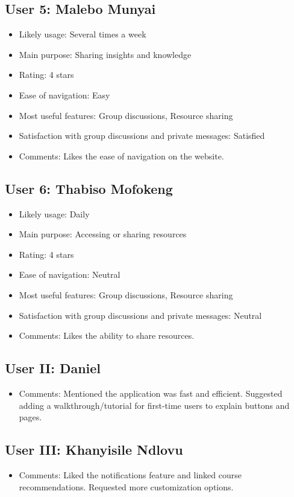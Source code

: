 \subsection*{User 5: Malebo Munyai}
\begin{itemize}
    \item Likely usage: Several times a week
    \item Main purpose: Sharing insights and knowledge
    \item Rating: 4 stars
    \item Ease of navigation: Easy
    \item Most useful features: Group discussions, Resource sharing
    \item Satisfaction with group discussions and private messages: Satisfied
    \item Comments: Likes the ease of navigation on the website.
\end{itemize}

\subsection*{User 6: Thabiso Mofokeng}
\begin{itemize}
    \item Likely usage: Daily
    \item Main purpose: Accessing or sharing resources
    \item Rating: 4 stars
    \item Ease of navigation: Neutral
    \item Most useful features: Group discussions, Resource sharing
    \item Satisfaction with group discussions and private messages: Neutral
    \item Comments: Likes the ability to share resources.
\end{itemize}

\subsection*{User II: Daniel}
\begin{itemize}
    \item Comments: Mentioned the application was fast and efficient. Suggested adding a walkthrough/tutorial for first-time users to explain buttons and pages.
\end{itemize}

\subsection*{User III: Khanyisile Ndlovu}
\begin{itemize}
    \item Comments: Liked the notifications feature and linked course recommendations. Requested more customization options.
\end{itemize}


